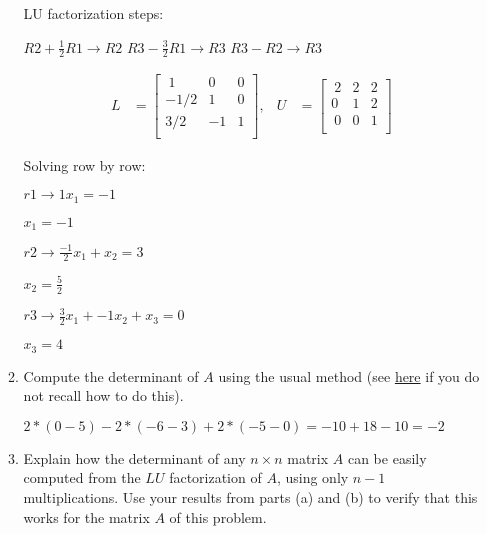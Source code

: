 \documentclass{article}
\begin{document}
\begin{enumerate}
\begin{enumerate}
\begin{mdframed}[style=MyFrame]

LU factorization steps:

$R2 + \frac{1}{2} R1 \rightarrow R2 $ \newline
$R3 - \frac{3}{2} R1 \rightarrow R3 $ \newline
$R3 - R2 \rightarrow R3 $ \newline

\begin{align*}
L &= \begin{bmatrix}
 ~1     &0     &0 \\
    -1/2     &1     &0 \\
     3/2     &-1     &1 \\
\end{bmatrix},
&U &= \begin{bmatrix}
 ~2     &2     &2 \\
    0     &1     &2 \\
     ~0     &0     &1 \\
\end{bmatrix}
\end{align*}

Solving row by row:

$r1 \rightarrow 1x_1 = -1$

$x_1 = -1$

$r2 \rightarrow \frac{-1}{2}x_1 + x_2 = 3$

$x_2 = \frac{5}{2}$

$r3 \rightarrow \frac{3}{2}x_1 + -1x_2 + x_3 = 0$

$x_3 = 4$

\end{mdframed}

\item Compute the determinant of $A$ using the usual method (see \href{http://en.wikipedia.org/wiki/Determinant#3.C2.A0.C3.97.C2.A03_matrices}{here} if you do not recall how to do this).

\begin{mdframed}[style=MyFrame]

$2*(0-5)-2*(-6-3)+2*(-5-0) = -10+18-10 = -2 $

\end{mdframed}

\item Explain how the determinant of any $n \times n$ matrix $A$ can be easily computed from the $LU$ factorization of $A$, using only $n-1$ multiplications. Use your results from parts (a) and (b) to verify that this works for the matrix $A$ of this problem. \newline


\end{enumerate}
\end{enumerate}
\end{document}

